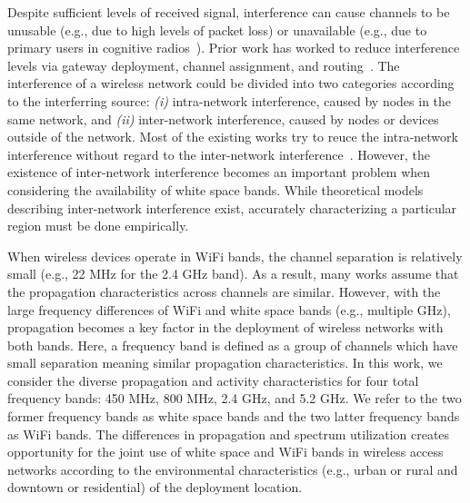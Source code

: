 Despite sufficient levels of received signal, interference can cause channels
to be unusable (e.g., due to high levels of packet loss) or unavailable (e.g., 
due to primary users in cognitive radios~\cite{haykin2005cognitive}).
Prior work has worked to reduce interference levels via gateway deployment,
channel assignment, and routing~\cite{he2008optimizing,tang2005interference}.
The interference of a wireless network could be divided into two categories
according to the interferring source: {\it (i)} intra-network interference,
caused by nodes in the same network, and {\it (ii)} inter-network interference,
caused by nodes or devices outside of the network. Most of the existing works
try to reuce the intra-network interference without regard to the inter-network 
interference~\cite{si2010overview}. However, the existence of inter-network 
interference becomes an important problem when considering the availability
of white space bands.  While theoretical models describing inter-network 
interference exist, accurately characterizing a particular region must be done empirically.

When wireless devices operate in WiFi bands, the channel separation is relatively 
small (e.g., 22 MHz for the 2.4 GHz band). As a result, many works assume that
the propagation characteristics across channels are similar. However, with the
large frequency differences of WiFi and white space bands (e.g., multiple GHz),
propagation becomes a key factor in the deployment of wireless networks with both bands.
Here, a frequency band is defined as a group of channels which have
small separation meaning similar propagation characteristics.
In this work, we consider the diverse propagation and activity characteristics
for four total frequency bands: 450 MHz, 800 MHz, 2.4 GHz, and 5.2 GHz.
We refer to the two former frequency bands as white space bands and
the two latter frequency bands as WiFi bands.
The differences in propagation and spectrum utilization creates opportunity
for the joint use of white space and WiFi bands in wireless access networks according
to the environmental characteristics (e.g., urban or rural and downtown or residential)
of the deployment location.

